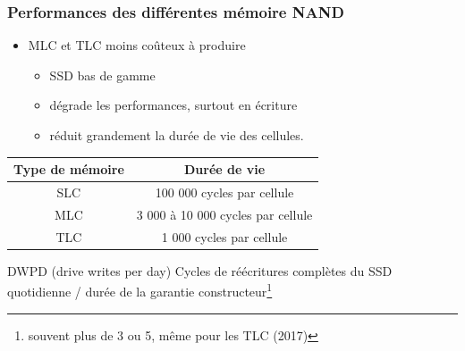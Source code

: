 \begin{frame}
\frametitle{Performances des différentes mémoire NAND}
\begin{itemize}
\item MLC et TLC moins coûteux à produire
\begin{itemize}
\item SSD bas de gamme
\item dégrade les performances, surtout en écriture
\item réduit grandement la durée de vie des cellules.
\end{itemize}
\end{itemize}

\begin{center}
\begin{tabular}{c|c}
Type de mémoire & Durée de vie \\
\hline
SLC & 100 000 cycles par cellule \\
MLC &  3 000 à 10 000 cycles par cellule \\
TLC & 1 000 cycles par cellule \\
\end{tabular}
\end{center}

\begin{exampleblock}{DWPD (drive writes per day)}
  Cycles de réécritures complètes du SSD quotidienne / durée de la garantie constructeur\footnote{souvent plus de 3 ou 5, même pour les TLC (2017)}
\end{exampleblock}
\end{frame}

